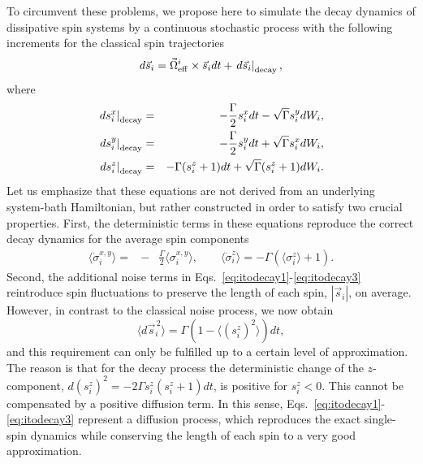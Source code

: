 \documentclass[pra,twocolumn,showpacs,preprintnumbers,amsmath,amssymb,superscriptaddress]{revtex4-1}
\newcommand{\erw}[1]{\langle#1\rangle}
\begin{document}
To circumvent these problems, we propose here to simulate the decay dynamics of dissipative spin systems by a continuous stochastic process with the following increments for the classical spin trajectories
\begin{equation}
d\vec s_i = \vec \Omega_{\rm eff}^i \times \vec s_i  dt + \left.d\vec
s_i\right|_{\rm decay},
\label{eq:meanfielddecay}
\end{equation}
where
\begin{eqnarray}
\label{eq:itodecay1}
\left.ds_i^x\right|_{\rm decay} &=& -\frac{\Gamma}{2} s_i^x dt-
\sqrt{\Gamma} s_i^y dW_i,\\
\left.ds_i^y\right|_{\rm decay} &=&-\frac{\Gamma}{2} s_i^y dt+ \sqrt{
	\Gamma} s_i^x  dW_i,\\
\left.ds_i^z\right|_{\rm decay} &=& -\Gamma (s_i^z+1) dt +
\sqrt{\Gamma} (s_i^z+1) dW_i.
\label{eq:itodecay3}
\end{eqnarray}
Let us emphasize that these equations are not derived from an underlying system-bath Hamiltonian, but rather constructed in order to satisfy two crucial properties. First, the deterministic terms in these equations reproduce the correct decay dynamics for the average spin components 
\begin{eqnarray}
\langle \dot  \sigma_i^{x,y}\rangle =&  -&\frac{\Gamma}{2} \erw{\sigma_i^{x,y}},\qquad \langle \dot  \sigma_i^z\rangle =  -\Gamma (\erw{\sigma_i^z}+1).
\end{eqnarray}
Second, the additional noise terms in Eqs.~\eqref{eq:itodecay1}-\eqref{eq:itodecay3} reintroduce spin fluctuations to preserve the length of each spin, $|\vec s_i|$, on average. 
 However, in contrast to the classical noise process, we now obtain~\cite{footnote} 
\begin{equation}
 \langle d \vec s^{\,2}_i \rangle = \Gamma \left(1-\erw{(s^z_i)^2}\right) dt,
\label{eq:spinlengthdecay}
\end{equation}
and this requirement can only be fulfilled up to a certain level of approximation. 
The reason is that for the decay process the deterministic change of the $z$-component, $d(s_i^z)^2=-2\Gamma s_i^z(s_i^z+1) dt$, is positive for $s_i^z<0$. This cannot be compensated by a positive diffusion term. In this sense, Eqs.~\eqref{eq:itodecay1}-\eqref{eq:itodecay3} represent a diffusion process, which reproduces the exact single-spin dynamics while conserving the length of each spin to a very good approximation. 
\end{document}
